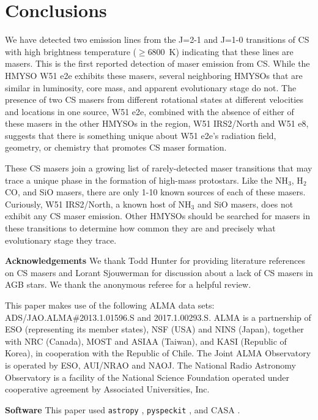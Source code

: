 \documentclass[twocolumn]{aastex62}
\begin{document}
\section{Conclusions}
We have detected two emission lines from the J=2-1 and J=1-0 transitions of CS
with high brightness temperature ($\geq$6800~K) indicating that these lines are masers.
This is the first reported detection of maser emission from CS.
While the HMYSO W51 e2e exhibits these masers, several neighboring HMYSOs that
are similar in luminosity, core mass, and apparent evolutionary stage do not.
The presence of two CS masers from different rotational states at different
velocities and locations in one source, W51 e2e, combined with the absence of
either of these masers in the other HMYSOs in the region, W51 IRS2/North and W51
e8, suggests that there is something unique about W51 e2e's radiation field,
geometry, or chemistry that promotes CS maser formation.

These CS masers join a growing list of rarely-detected maser transitions
that may trace a unique phase in the formation of high-mass protostars.
Like the NH$_3$, H$_2$CO, and SiO masers, there are only 1-10 known sources of
each of these masers.  Curiously, W51 IRS2/North, a known host of NH$_3$ and SiO masers,
does not exhibit any CS maser emission.  Other HMYSOs should be searched for
masers in these transitions to determine how common they are and precisely
what evolutionary stage they trace.

\textbf{Acknowledgements}
We thank Todd Hunter for providing literature references on CS masers and
Lorant Sjouwerman for discussion about a lack of CS masers in AGB stars.
We thank the anonymous referee for a helpful review.

This paper makes use of the following ALMA data sets:
ADS/JAO.ALMA\#2013.1.01596.S and 2017.1.00293.S. ALMA is a partnership of ESO
(representing its member states), NSF (USA) and NINS (Japan), together with NRC
(Canada), MOST and ASIAA (Taiwan), and KASI (Republic of Korea), in cooperation
with the Republic of Chile. The Joint ALMA Observatory is operated by ESO,
AUI/NRAO and NAOJ.  The National Radio Astronomy Observatory is a facility of
the National Science Foundation operated under cooperative agreement by
Associated Universities, Inc.



\textbf{Software}
This paper used \texttt{astropy}
\citep{Astropy-Collaboration2013a,Astropy-Collaboration2018a},
\texttt{pyspeckit} \citep{Ginsburg2011c}, and CASA \citep{McMullin2007a}.
\end{document}
